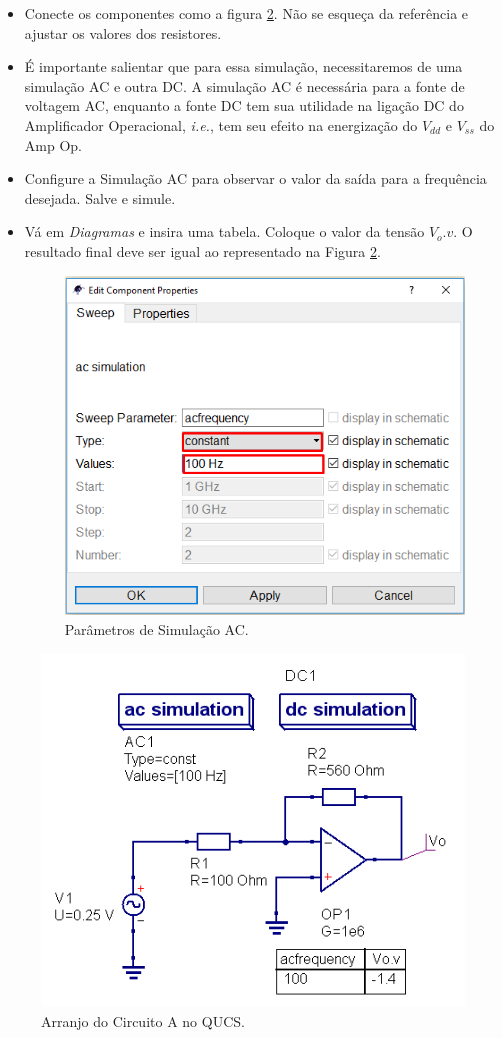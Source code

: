 \begin{itemize}
    \item Conecte os componentes como a figura \ref{fig:circ_a_q}. Não se esqueça da referência e ajustar os valores dos resistores.
    \item É importante salientar que para essa simulação, necessitaremos de uma simulação AC e outra DC. A simulação AC é necessária para a fonte de voltagem AC, enquanto a fonte DC tem sua utilidade na ligação DC do Amplificador Operacional, \textit{i.e.}, tem seu efeito na energização do $V_{dd}$ e $V_{ss}$ do Amp Op.
    \item  Configure a Simulação AC para observar o valor da saída para a frequência desejada. Salve e simule.
    \item Vá em \textit{Diagramas} e insira uma tabela. Coloque o valor da tensão $V_o.v$. O resultado final deve ser igual ao representado na Figura \ref{fig:circ_a_q}.
    
    \begin{figure}[H]
        \centering
        \includegraphics[width=.5\textwidth]{imagens/CircuitoA/simulacao.png}
        \caption{Parâmetros de Simulação AC.}
        \label{fig:my_label}
    \end{figure}
    
\end{itemize}


\begin{figure}[H]
    \centering
    \includegraphics[width=.5\textwidth]{imagens/CircuitoA/circuito_a_sim.png}
    \caption{Arranjo do Circuito A no QUCS.}
    \label{fig:circ_a_q}
\end{figure}

